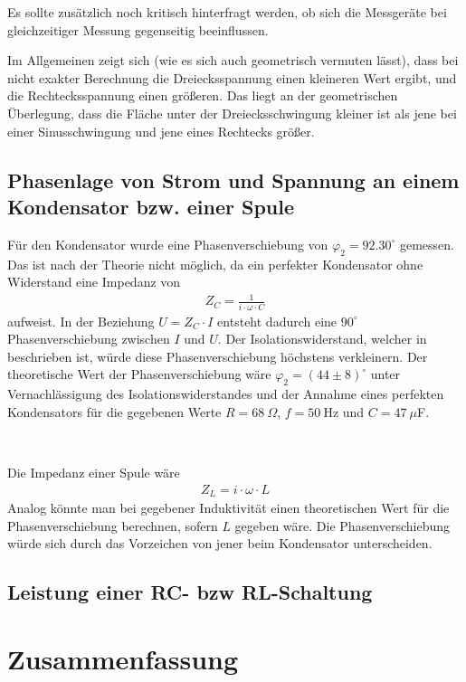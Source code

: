 \documentclass{article}
\begin{document}
Es sollte zusätzlich noch kritisch hinterfragt werden, ob sich die Messgeräte bei gleichzeitiger Messung gegenseitig beeinflussen.

Im Allgemeinen zeigt sich (wie es sich auch geometrisch vermuten lässt), dass bei nicht exakter Berechnung die Dreiecksspannung einen kleineren Wert ergibt, und die Rechtecksspannung einen größeren. Das liegt an der geometrischen Überlegung, dass die Fläche unter der Dreiecksschwingung kleiner ist als jene bei einer Sinusschwingung und jene eines Rechtecks größer.

\subsection{Phasenlage von Strom und Spannung an einem Kondensator bzw. einer Spule}

Für den Kondensator wurde eine Phasenverschiebung von $\varphi_2 = 92.30^\circ$ gemessen. Das ist nach der Theorie nicht möglich, da ein perfekter Kondensator ohne Widerstand eine Impedanz von 
\begin{align*}
Z_C = \frac{1}{i\cdot\omega \cdot C}
\end{align*}
aufweist. In der Beziehung $U=Z_C\cdot I$ entsteht dadurch eine $90^\circ$ Phasenverschiebung zwischen $I$ und $U$. Der Isolationswiderstand, welcher in \cite{moodle} beschrieben ist, würde diese Phasenverschiebung höchstens verkleinern. Der theoretische Wert der Phasenverschiebung wäre $\varphi_2 = (44\pm8)^\circ$ unter Vernachlässigung des Isolationswiderstandes und der Annahme eines perfekten Kondensators für die gegebenen Werte $R = 68~\Omega$, $f=50~$Hz und $C=47~\mu$F.

~

Die Impedanz einer Spule wäre 
\begin{align*}
Z_L = i\cdot\omega \cdot L
\end{align*}
Analog könnte man bei gegebener Induktivität einen theoretischen Wert für die Phasenverschiebung berechnen, sofern $L$ gegeben wäre. Die Phasenverschiebung würde sich durch das Vorzeichen von jener beim Kondensator unterscheiden.


\subsection{Leistung einer RC- bzw RL-Schaltung}




\section{Zusammenfassung}
\end{document}
